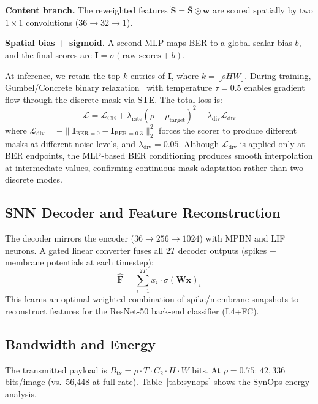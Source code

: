 \documentclass[conference]{IEEEtran}
\begin{document}
\textbf{Content branch.} The reweighted features $\tilde{\mathbf{S}}=\bar{\mathbf{S}}\odot \mathbf{w}$ are scored spatially by two $1{\times}1$ convolutions ($36{\to}32{\to}1$).

\textbf{Spatial bias + sigmoid.} A second MLP maps BER to a global scalar bias $b$, and the final scores are $\mathbf{I}=\sigma(\text{raw\_scores}+b)$.

At inference, we retain the top-$k$ entries of $\mathbf{I}$, where $k=\lfloor \rho HW\rfloor$. During training, Gumbel/Concrete binary relaxation~\cite{jang2017categorical, maddison2017concrete} with temperature $\tau{=}0.5$ enables gradient flow through the discrete mask via STE. The total loss is:
\begin{equation}
\mathcal{L}=\mathcal{L}_{\text{CE}}+\lambda_{\text{rate}}(\bar{\rho}-\rho_{\text{target}})^2+\lambda_{\text{div}}\mathcal{L}_{\text{div}}
\end{equation}
where $\mathcal{L}_{\text{div}}=-\|\mathbf{I}_{\text{BER}=0}-\mathbf{I}_{\text{BER}=0.3}\|_2^2$ forces the scorer to produce different masks at different noise levels, and $\lambda_{\text{div}}{=}0.05$. Although $\mathcal{L}_{\text{div}}$ is applied only at BER endpoints, the MLP-based BER conditioning produces smooth interpolation at intermediate values, confirming continuous mask adaptation rather than two discrete modes.

\subsection{SNN Decoder and Feature Reconstruction}

The decoder mirrors the encoder ($36{\to}256{\to}1024$) with MPBN and LIF neurons. A gated linear converter fuses all $2T$ decoder outputs (spikes $+$ membrane potentials at each timestep):
\begin{equation}
    \hat{\mathbf{F}} = \sum_{i=1}^{2T} x_i \cdot \sigma(\mathbf{W}\mathbf{x})_i
\end{equation}
This learns an optimal weighted combination of spike/membrane snapshots to reconstruct features for the ResNet-50 back-end classifier (L4+FC).

\subsection{Bandwidth and Energy}

The transmitted payload is $B_{\text{tx}} = \rho \cdot T \cdot C_2 \cdot H \cdot W$ bits. At $\rho{=}0.75$: $42{,}336$ bits/image (vs.\ 56,448 at full rate). Table~\ref{tab:synops} shows the SynOps energy analysis.
\end{document}
